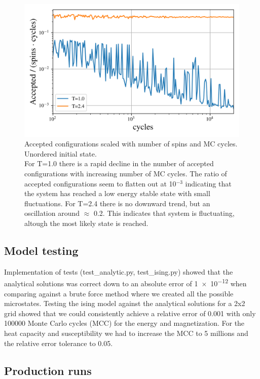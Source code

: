 \begin{figure}[H]
  \centering
  \includegraphics[width=\textwidth]{../figures/accepted.png}
  \caption{Accepted configurations scaled with number of spins and MC cycles.
  Unordered initial state. \\
  For T=1.0 there is a rapid decline in the number of accepted
  configurations with increasing number of MC cycles. The ratio of accepted
  configurations seem to flatten out at 10$^{-3}$ indicating that the system
  has reached a low energy stable state with small fluctuations.
  For T=2.4 there is no downward trend, but an oscillation around $\approx$ 0.2.
  This indicates that system is fluctuating, altough the most likely state is
  reached.}
  \label{fig:accepted}
\end{figure}

\subsection{Model testing}

Implementation of tests (test\_analytic.py, test\_ising.py) showed that the
analytical solutions was correct down to an absolute error of \num{1e-12}  when
comparing against a brute force method where we created all the possible
microstates.
Testing the ising model against the analytical solutions for a 2x2 grid showed
that we could consistently achieve a relative error of 0.001 with only 100000
Monte Carlo cycles (MCC) for the energy and magnetization. For the heat capacity
and susceptibility we had to increase the MCC to 5 millions and the relative
error tolerance to 0.05.


\subsection{Production runs}


